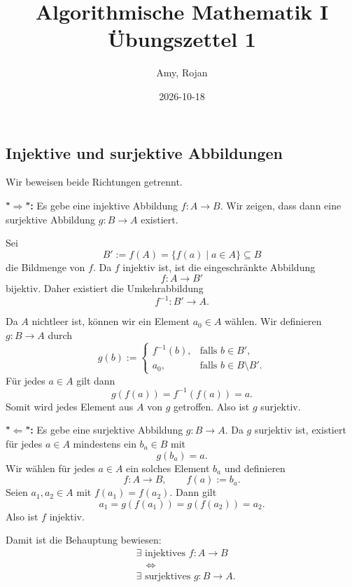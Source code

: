 \documentclass{report}
\title{\huge{Algorithmische Mathematik I \\ Übungszettel 1}}
\author{\huge{Amy, Rojan}}
\date{2026-10-18}
\begin{document}
\maketitle
\tableofcontents

\newpage
\chapter{}


\section{Injektive und surjektive Abbildungen}


\sol Wir beweisen beide Richtungen getrennt.

\textbf{"\(\Rightarrow\)":} Es gebe eine injektive Abbildung \(f\colon A\to B\). Wir zeigen, dass dann eine surjektive Abbildung \(g\colon B\to A\) existiert.

Sei
\[
B':=f(A)=\{f(a)\mid a\in A\}\subseteq B
\]
die Bildmenge von \(f\). Da \(f\) injektiv ist, ist die eingeschränkte Abbildung
\[
f\colon A\to B'
\]
bijektiv. Daher existiert die Umkehrabbildung
\[
f^{-1}\colon B'\to A.
\]

Da \(A\) nichtleer ist, können wir ein Element \(a_0\in A\) wählen. Wir definieren \(g\colon B\to A\) durch
\[
g(b):=
\begin{cases}
f^{-1}(b),&\text{falls }b\in B',\\
a_0,&\text{falls }b\in B\setminus B'.
\end{cases}
\]
Für jedes \(a\in A\) gilt dann
\[
g(f(a))=f^{-1}(f(a))=a.
\]
Somit wird jedes Element aus \(A\) von \(g\) getroffen. Also ist \(g\) surjektiv.

\textbf{"\(\Leftarrow\)":} Es gebe eine surjektive Abbildung \(g\colon B\to A\). Da \(g\) surjektiv ist, existiert für jedes \(a\in A\) mindestens ein \(b_a\in B\) mit
\[
g(b_a)=a.
\]
Wir wählen für jedes \(a\in A\) ein solches Element \(b_a\) und definieren
\[
f\colon A\to B,\qquad f(a):=b_a.
\]
Seien \(a_1,a_2\in A\) mit \(f(a_1)=f(a_2)\). Dann gilt
\[
a_1=g(f(a_1))
=g(f(a_2))
=a_2.
\]
Also ist \(f\) injektiv.

Damit ist die Behauptung bewiesen:
\[
\boxed{
\begin{aligned}
&\exists\text{ injektives }f\colon A\to B\\
&\quad\Longleftrightarrow\\
&\exists\text{ surjektives }g\colon B\to A.
\end{aligned}}
\]
\end{document}
